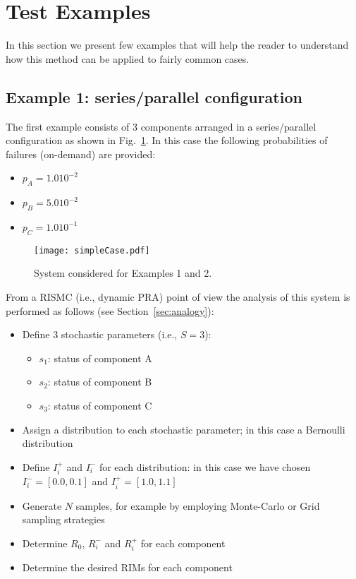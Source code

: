 \section{Test Examples}
\label{sec:test}

In this section we present few examples that will help the reader to understand 
how this method can be applied to fairly common cases.

\subsection{Example 1: series/parallel configuration}
\label{sec:example1}

The first example consists of 3 components 
arranged in a series/parallel configuration as shown in Fig.~\ref{fig:example12}. 
In this case the following probabilities of failures (on-demand) are provided:
\begin{itemize}
  \item $p_A = 1.0 10^{-2}$
  \item $p_B = 5.0 10^{-2}$
  \item $p_C = 1.0 10^{-1}$
\end{itemize}

\begin{figure}
    \centering
    \centerline{\texttt{[image: simpleCase.pdf]}}
    \caption{System considered for Examples 1 and 2.}
    \label{fig:example12}
\end{figure}
  
From a RISMC (i.e., dynamic PRA) point of view the analysis of this system is performed as follows 
(see Section~\ref{sec:analogy}):
\begin{itemize}
  \item Define 3 stochastic parameters (i.e., $S=3$):
    \begin{itemize}
      \item $s_1$: status of component A
      \item $s_2$: status of component B
      \item $s_3$: status of component C
    \end{itemize}
  \item Assign a distribution to each stochastic parameter; in this case a Bernoulli 
        distribution  
  \item Define $I_i^+$ and $I_i^-$ for each distribution: in this case we have chosen 
        $I_i^-=[0.0,0.1]$ and $I_i^+=[1.0,1.1]$ 
  \item Generate $N$ samples, for example by employing Monte-Carlo or Grid sampling strategies
  \item Determine $R_0$, $R_i^-$ and $R_i^+$ for each component 
  \item Determine the desired RIMs for each component
\end{itemize}

